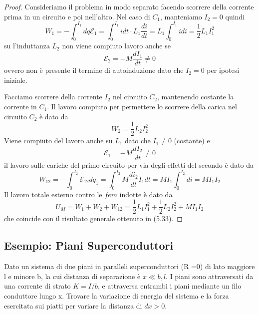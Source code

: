 \begin{proof}
	Consideriamo il problema in modo separato facendo scorrere della corrente prima in un circuito e poi nell'altro. Nel caso di $C_1$, manteniamo $I_2 = 0$ quindi
	\begin{equation*}
		W_1 = - \int_0^{I_1} dq \mathcal{E}_1 = \int_{0}^{I_1} idt \cdot L_1 \frac{di}{dt} = L_1 \int_{0}^{I_1} idi = \frac{1}{2}L_1I_1^2 
	\end{equation*}
su l'induttanza $L_2$ non viene compiuto lavoro anche se 
\begin{equation*}
	\mathcal{E}_2 = - M \frac{dI_1}{dt} \neq 0
\end{equation*}
ovvero non \`e presente il termine di autoinduzione dato che $I_2 =0$ per ipotesi iniziale.

Facciamo scorrere della corrente $I_2$ nel circuito $C_2$, mantenendo costante la corrente in $C_1$. Il lavoro compiuto per permettere lo scorrere della carica nel circuito $C_2$ \`e dato da
\begin{equation*}
	W_2 = \frac{1}{2}L_2 I_2^2
\end{equation*}
Viene compiuto del lavoro anche su $L_1$ dato che $I_1 \neq 0$ (costante) e 
\begin{equation*}
	\mathcal{E}_1 =  - M \frac{dI_2}{dt} \neq 0
\end{equation*}
il lavoro sulle cariche del primo circuito per via degli effetti del secondo \`e dato da
\begin{equation*}
	W_{12} = - \int_{0}^{I_2} \mathcal{E}_{12}dq_1 = \int_{0}^{I_2} M \frac{d i_2}{dt}I_1 dt = MI_1 \int _0^{I_2}di = M I_1 I_2
\end{equation*}
Il lavoro totale esterno contro le $fem$ indotte \`e dato da 
\begin{equation*}
	U_M = W_1 + W_2 + W_{12} = \frac{1}{2}L_1 I_1^2 + \frac{1}{2}L_2 I_2^2 + MI_1I_2
\end{equation*}
che coincide con il risultato generale ottenuto in (5.33).

\end{proof} 

\subsection{Esempio: Piani Superconduttori}


Dato un sistema di due piani in paralleli superconduttori (R =0) di lato maggiore l e minore b, la cui distanza di separazione \`e $x \ll b,l$. I piani sono attraversati da una corrente di strato $K = I/b$, e attraversa entrambi i piani mediante un filo conduttore lungo x. Trovare la variazione di energia del sistema e la forza esercitata sui piatti per variare la distanza di $dx > 0$.

